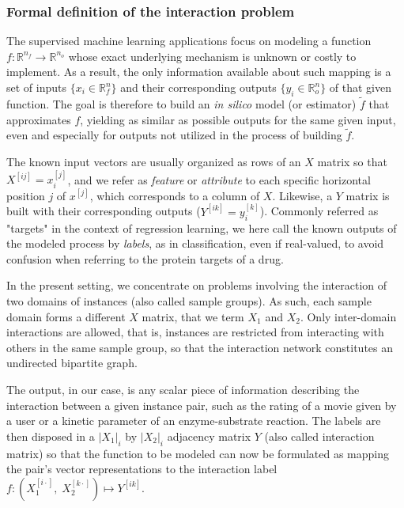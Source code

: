 \documentclass[conference]{IEEEtran}
\newcommand{\el}[1]{^{[#1]}}
\begin{document}
\subsubsection{Formal definition of the interaction problem}

The supervised machine learning applications focus on modeling a function $f
\colon \mathbb{R}^{n_f} \to \mathbb{R}^{n_o}$ whose exact underlying mechanism
is unknown or costly to implement. As a result, the only information available
about such mapping is a set of inputs $\{x_i \in \mathbb R^n_f\}$ and their
corresponding outputs $\{y_i \in \mathbb R^n_o\}$ of that given function. The
goal is therefore to build an \textit{in silico} model (or estimator) $\tilde f$
that approximates $f$, yielding as similar as possible outputs for the same
given input, even and especially for outputs not utilized in the process of
building $\tilde f$.


The known input vectors are usually organized as rows of an $X$ matrix so that
$X\el{ij} = x_i\el j$, and we refer as \emph{feature} or \emph{attribute} to
each specific horizontal position $j$ of $x\el j$, which corresponds to a column
of $X$. Likewise, a $Y$ matrix is built with their corresponding outputs
($Y\el{ik} = y_i\el k$). Commonly referred as "targets" in the context of
regression learning, we here call the known outputs of the modeled process by
\emph{labels}, as in classification, even if real-valued, to avoid confusion
when referring to the protein targets of a drug.

In the present setting, we concentrate on problems involving the interaction of
two domains of instances (also called sample groups). As such, each sample
domain forms a different $X$ matrix, that we term $X_1$ and $X_2$. Only
inter-domain interactions are allowed, that is, instances are restricted from
interacting with others in the same sample group, so that the interaction
network constitutes an undirected bipartite graph.

The output, in our case, is any scalar piece of information describing the
interaction between a given instance pair, such as the rating of a movie given
by a user or a kinetic parameter of an enzyme-substrate reaction. The labels are
then disposed in a $|X_1|_i$ by $|X_2|_i$ adjacency matrix $Y$ (also called
interaction matrix) so that the function to be modeled can now be formulated as
mapping the pair's vector representations to the interaction label $f\colon
(X_1\el{i\cdot},\; X_2\el{k\cdot}) \mapsto Y\el{ik}$.
\end{document}
